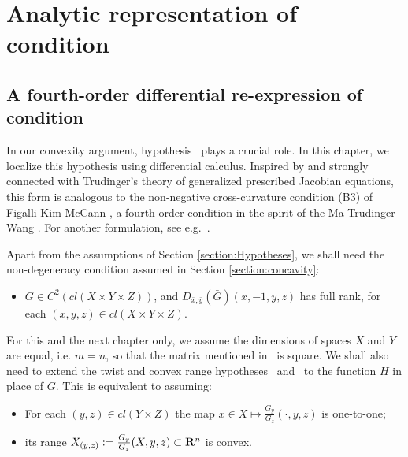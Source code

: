 \chapter{Analytic representation of condition \Gthree}\label{chapter:analytic_representation}



\section{A fourth-order differential re-expression of condition \Gthree}\label{section:4thorder}



In our convexity argument, hypothesis \Gthree\ plays a crucial role. In this chapter, we 
localize this hypothesis using differential calculus. Inspired by and strongly connected with Trudinger's theory of generalized prescribed Jacobian equations, this form is analogous to the non-negative cross-curvature condition (B3) 
of Figalli-Kim-McCann \cite{FigalliKimMcCann11}, a fourth order condition in the spirit of the Ma-Trudinger-Wang \cite{MaTrudingerWang05}. For another formulation, see e.g.\ \cite{GuillenKitagawa15}.
\medskip


Apart from the assumptions of Section \ref{section:Hypotheses}, we shall need the non-degeneracy
condition assumed in Section \ref{section:concavity}:
\begin{itemize}
	\item[\Gsix] $G\in C^2(cl(X\times Y \times Z)
	)$, and $D_{\bar{x},\bar{y}}(\bar{G})(x,-1,y,z)$ has full rank, for each $(x,y,z)\in cl(X\times Y\times Z)$. 
\end{itemize}
For this and the next chapter only, we assume the dimensions of spaces $X$ and $Y$ are equal, i.e. $m=n$,
so that the matrix mentioned in \Gsix\ is square.
We shall also need to extend the twist and convex range hypotheses \Gone\ and \Gtwo\  
to the function $H$ in place of $G$. This is equivalent to assuming:

\begin{itemize}
	\item[\Gseven] For each $(y, z)\in cl( Y \times Z)$ the map $x \in X \longmapsto \frac{G_y}{G_z}(\cdot, y,z)$ is one-to-one;
	\item[\Geight] its range $X_{(y,z)} := \frac{G_y}{G_z}(X,y,z) \subset {\mathbf R}^n$ is convex.
\end{itemize}


